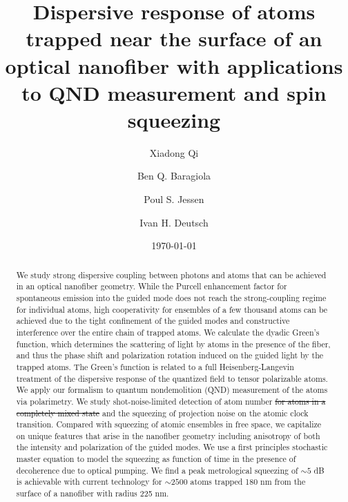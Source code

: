 \documentclass[aps,pra,twocolumn]{revtex4-1} %
\begin{document}
\title{Dispersive response of atoms trapped near the surface of an optical nanofiber with applications to QND measurement and spin squeezing}
\author{Xiadong Qi}
\author{Ben Q. Baragiola}
\author{Poul S. Jessen}
\author{Ivan H. Deutsch}
\date{\today}

\begin{abstract}
We study strong dispersive coupling between photons and atoms that can be achieved in an optical nanofiber geometry.  While the Purcell enhancement factor for spontaneous emission into the guided mode does not reach the strong-coupling regime for individual atoms, high cooperativity for ensembles of a few thousand atoms can be achieved due to the tight confinement of the guided modes and constructive interference over the entire chain of trapped atoms. We calculate the dyadic Green's function, which determines the scattering of light by atoms in the presence of the fiber, and thus the phase shift and polarization rotation induced on the guided light by the trapped atoms.  The Green's function is related to a full Heisenberg-Langevin treatment of the dispersive response of the quantized field to tensor polarizable atoms.  We apply our formalism to quantum nondemolition (QND) measurement of the atoms via polarimetry.  We study shot-noise-limited detection of atom number \sout{for atoms in a completely mixed state} and the squeezing of projection noise on the atomic clock transition.  Compared with squeezing of atomic ensembles in free space, we capitalize on unique features that arise in the nanofiber geometry including anisotropy of both the intensity and polarization of the guided modes.  We use a first principles stochastic master equation to model the squeezing as function of time in the presence of decoherence due to optical pumping.  We find a peak metrological squeezing of $\sim 5$ dB is achievable with current technology for $\sim 2500$ atoms trapped 180 nm from the surface of a nanofiber with radius 225 nm.  
\end{abstract}
\end{document}
